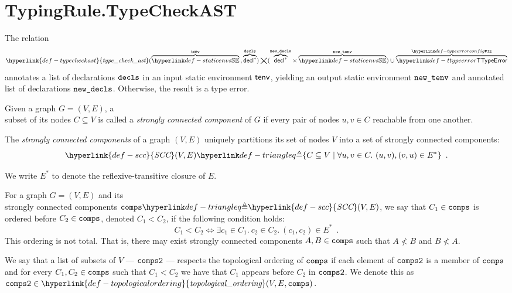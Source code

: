 \documentclass{book}
\newcommand\ProseOtherwiseTypeError[0]{Otherwise, the result is a type error.}
\newcommand\typecheckast[0]{\hyperlink{def-typecheckast}{\textfunc{type\_check\_ast}}}
\newcommand\SCC[0]{\hyperlink{def-scc}{\textfunc{SCC}}}
\newcommand\topologicalordering[0]{\hyperlink{def-topologicalordering}{\textfunc{topological\_ordering}}}
\begin{document}
\section{TypingRule.TypeCheckAST \label{sec:TypingRule.TypeCheckAST}}
\hypertarget{def-typecheckast}{}
The relation
\[
\typecheckast(
  \overname{\staticenvs}{\tenv} \aslsep
  \overname{\decl^*}{\decls}
) \aslrel
(\overname{\decl^*}{\newdecls} \times \overname{\staticenvs}{\newtenv})
\cup \overname{\TTypeError}{\TypeErrorConfig}
\]
annotates a list of declarations $\texttt{decls}$ in an input static environment $\textsf{tenv}$,
yielding an output static environment $\texttt{new\_tenv}$ and annotated list of declarations $\texttt{new\_decls}$.
\ProseOtherwiseTypeError

\begin{definition}
\hypertarget{def-scc}{}
Given a graph $G=(V, E)$, a \\ subset of its nodes $C \subseteq V$ is called
a \emph{strongly connected component} of $G$ if
every pair of nodes $u,v \in C$ reachable from one another.

The \emph{strongly connected components} of a graph $(V, E)$ uniquely partitions its set of
nodes $V$ into a set of strongly connected components:
\[
\SCC(V, E) \triangleq \{ C \subseteq V \;|\; \forall u,v\in C.\ (u,v), (v,u) \in E^* \} \enspace.
\]

We write $E^*$ to denote the reflexive-transitive closure of $E$.
\end{definition}

\begin{definition}
For a graph $G=(V, E)$ and its \\
strongly connected components $\comps \triangleq \SCC(V, E)$,
we say that $C_1\in\texttt{comps}$ is ordered before $C_2\in\texttt{comps}$, denoted $C_1 < C_2$,
if the following condition holds:
\[
C_1 < C_2 \Leftrightarrow \exists c_1\in C_1.\ c_2\in C_2.\ (c_1,c_2) \in E^* \enspace.
\]
This ordering is not total. That is, there may exist strongly connected components
$A,B\in\texttt{comps}$ such that $A \not< B$ and $B \not< A$.

\hypertarget{def-topologicalordering}{}
We say that a list of subsets of $V$ --- $\texttt{comps2}$ --- respects the topological ordering of $\texttt{comps}$
if each element of $\texttt{comps2}$ is a member of $\texttt{comps}$ and for every $C_1,C_2\in\texttt{comps}$ such that
$C_1 < C_2$ we have that $C_1$ appears before $C_2$ in $\texttt{comps2}$.
We denote this as $\compstwo \in \topologicalordering(V, E, \comps)$.
\end{definition}
\end{document}

